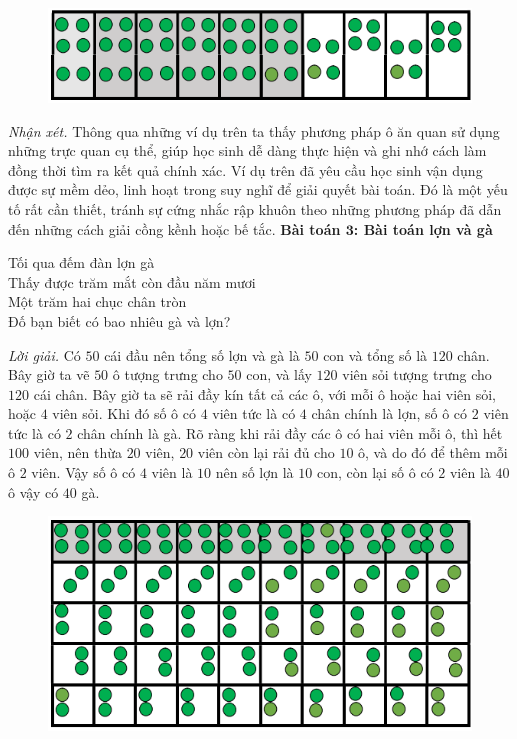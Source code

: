 \begin{multicols}{2}
	\begin{figure}[H]
		\vspace*{5pt}
		\centering
		\captionsetup{labelformat= empty, justification=centering}
		\includegraphics[width= 1\linewidth]{2}
		\vspace*{-15pt}
	\end{figure}
	\textit{Nhận xét.}
	Thông qua những ví dụ trên ta thấy phương pháp ô ăn quan sử dụng những trực quan cụ thể, giúp học sinh dễ dàng thực hiện và ghi nhớ cách làm đồng thời tìm ra kết quả chính xác.
	\vskip 0.1cm
	Ví dụ trên đã yêu cầu học sinh vận dụng được sự mềm dẻo, linh hoạt trong suy nghĩ để giải quyết bài toán. Đó là một yếu tố rất cần thiết, tránh sự cứng nhắc rập khuôn theo những phương pháp đã dẫn đến những cách giải cồng kềnh hoặc bế tắc.
	\vskip 0.1cm
	\textbf{\color{diendantoanhoc}Bài toán $\pmb3$: Bài toán lợn và gà}
	\begin{center}
		Tối qua đếm đàn lợn gà\\
		Thấy được trăm mắt còn đầu năm mươi\\
		Một trăm hai chục chân tròn\\
		Đố bạn biết có bao nhiêu gà và lợn?
	\end{center}
	\textit{Lời giải.}
	Có $50$ cái đầu nên tổng số lợn và gà là $50$ con và tổng số là $120$ chân. Bây giờ ta vẽ $50$ ô tượng trưng cho $50$ con, và lấy $120$ viên sỏi tượng trưng cho $120$ cái chân.
	\vskip 0.1cm
	Bây giờ ta sẽ rải đầy kín tất cả các ô, với mỗi ô hoặc hai viên sỏi, hoặc $4$ viên sỏi. Khi đó số ô có $4$ viên tức là có $4$ chân chính là lợn, số ô có $2$ viên tức là có $2$ chân chính là gà.
	\vskip 0.1cm
	Rõ ràng khi rải đầy các ô có hai viên mỗi ô, thì hết $100$ viên, nên thừa $20$ viên, $20$ viên còn lại rải đủ cho $10$ ô, và do đó để thêm mỗi ô $2$ viên. Vậy số ô có $4$ viên là $10$ nên số lợn là $10$ con, còn lại số ô có $2$ viên là $40$ ô vậy có $40$ gà.
	\begin{figure}[H]
		\vspace*{-5pt}
		\centering
		\captionsetup{labelformat= empty, justification=centering}
		\includegraphics[width= 1\linewidth]{3}

\end{figure}
\end{multicols}
